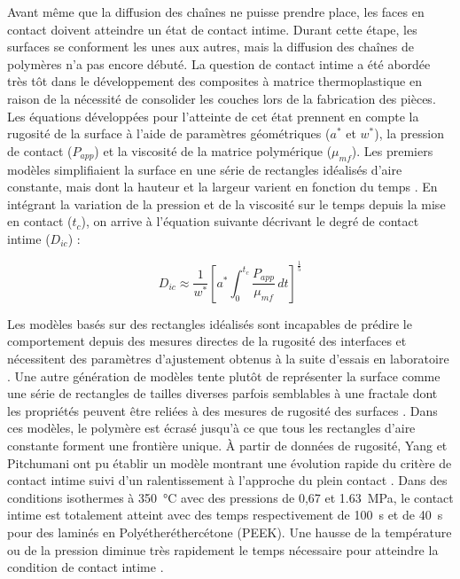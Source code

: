 Avant même que la diffusion des chaînes ne puisse prendre place, les faces en contact doivent atteindre un état de contact intime. 
Durant cette étape, les surfaces se conforment les unes aux autres, mais la diffusion des chaînes de polymères n'a pas encore débuté. 
La question de contact intime a été abordée très tôt dans le développement des composites à matrice thermoplastique en raison de la nécessité de consolider les couches lors de la fabrication des pièces. 
Les équations développées pour l'atteinte de cet état prennent en compte la rugosité de la surface à l'aide de paramètres géométriques ($a^*$ et $w^*$), la pression de contact ($P_{app}$) et la viscosité de la matrice polymérique ($\mu _{mf}$). 
Les premiers modèles simplifiaient la surface en une série de rectangles idéalisés d'aire constante, mais dont la hauteur et la largeur varient en fonction du temps \cite{Lee1987}. 
En intégrant la variation de la pression et de la viscosité sur le temps depuis la mise en contact ($t_c$), on arrive à l'équation suivante décrivant le degré de contact intime ($D_{ic}$) \cite{Mantell1992a} : 

\begin{equation}
D_{ic} \approx \frac{1}{w^*} \left[ a^* \int_{0}^{t_c} \frac{P_{app}}{\mu _{mf}} \, dt \right]^{\frac{1}{5}}
\label{eq:contact_intime}
\end{equation}

Les modèles basés sur des rectangles idéalisés sont incapables de prédire le comportement depuis des mesures directes de la rugosité des interfaces et nécessitent des paramètres d'ajustement obtenus à la suite d'essais en laboratoire \cite{Yang2001}. 
Une autre génération de modèles tente plutôt de représenter la surface comme une série de rectangles de tailles diverses parfois semblables à une fractale dont les propriétés peuvent être reliées à des mesures de rugosité des surfaces \cite{Yang2001,Yang2002}. 
Dans ces modèles, le polymère est écrasé jusqu'à ce que tous les rectangles d'aire constante forment une frontière unique. 
À partir de données de rugosité, Yang et Pitchumani ont pu établir un modèle montrant une évolution rapide du critère de contact intime suivi d'un ralentissement à l'approche du plein contact \cite{Yang2001}. 
Dans des conditions isothermes à \SI[locale=FR]{350}{\celsius} avec des pressions de 0,67 et \SI[locale=FR]{1,63}{\mega\pascal}, le contact intime est totalement atteint avec des temps respectivement de \SI[locale=FR]{100}{\second} et de \SI[locale=FR]{40}{\second} pour des laminés en Polyétheréthercétone (PEEK). 
Une hausse de la température ou de la pression diminue très rapidement le temps nécessaire pour atteindre la condition de contact intime \cite{Yang2002}. 

